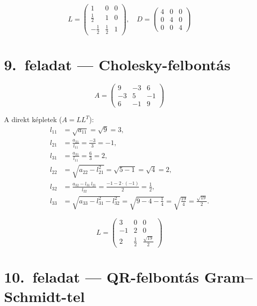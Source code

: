 \documentclass[a4paper,12pt]{article}
\begin{document}
\[
\boxed{
L = \begin{pmatrix} 1 & 0 & 0 \\ \frac{1}{2} & 1 & 0 \\ -\frac{1}{2} & \frac{1}{2} & 1 \end{pmatrix}, \quad
D = \begin{pmatrix} 4 & 0 & 0 \\ 0 & 4 & 0 \\ 0 & 0 & 4 \end{pmatrix}
}
\]

\section*{9.\ feladat --- Cholesky-felbontás}

\[
A = \begin{pmatrix} 9 & -3 & 6 \\ -3 & 5 & -1 \\ 6 & -1 & 9 \end{pmatrix}
\]

A direkt képletek ($A = LL^T$):
\begin{align}
l_{11} &= \sqrt{a_{11}} = \sqrt{9} = 3, \\[4pt]
l_{21} &= \frac{a_{21}}{l_{11}} = \frac{-3}{3} = -1, \\[4pt]
l_{31} &= \frac{a_{31}}{l_{11}} = \frac{6}{3} = 2, \\[4pt]
l_{22} &= \sqrt{a_{22} - l_{21}^2} = \sqrt{5 - 1} = \sqrt{4} = 2, \\[4pt]
l_{32} &= \frac{a_{32} - l_{31}\,l_{21}}{l_{22}} = \frac{-1 - 2\cdot(-1)}{2} = \frac{1}{2}, \\[4pt]
l_{33} &= \sqrt{a_{33} - l_{31}^2 - l_{32}^2} = \sqrt{9 - 4 - \frac{1}{4}} = \sqrt{\frac{19}{4}} = \frac{\sqrt{19}}{2}.
\end{align}

\[
\boxed{
L = \begin{pmatrix} 3 & 0 & 0 \\ -1 & 2 & 0 \\ 2 & \frac{1}{2} & \frac{\sqrt{19}}{2} \end{pmatrix}
}
\]

\section*{10.\ feladat --- QR-felbontás Gram--Schmidt-tel}
\end{document}
